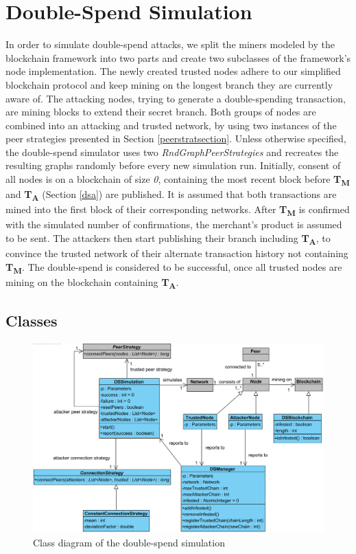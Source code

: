 \documentclass[a4paper,12pt,twoside]{report}
\begin{document}
\section{Double-Spend Simulation}
In order to simulate double-spend attacks, we split the miners modeled by the blockchain framework into two parts and create two subclasses of the framework's node implementation. The newly created trusted nodes adhere to our simplified blockchain protocol and keep mining on the longest branch they are currently aware of. The attacking nodes, trying to generate a double-spending transaction, are mining blocks to extend their secret branch. Both groups of nodes are combined into an attacking and trusted network, by using two instances of the peer strategies presented in Section \ref{peerstratsection}. Unless otherwise specified, the double-spend simulator uses two \textit{RndGraphPeerStrategies} and recreates the resulting graphs randomly before every new simulation run. Initially, consent of all nodes is on a blockchain of size \textit{0}, containing the most recent block before \textbf{T\textsubscript{M}} and \textbf{T\textsubscript{A}} (Section \ref{dsa}) are published. It is assumed that both transactions are mined into the first block of their corresponding networks. After \textbf{T\textsubscript{M}} is confirmed with the simulated number of confirmations, the merchant's product is assumed to be sent. The attackers then start publishing their branch including \textbf{T\textsubscript{A}}, to convince the trusted network of their alternate transaction history not containing \textbf{T\textsubscript{M}}. The double-spend is considered to be successful, once all trusted nodes are mining on the blockchain containing \textbf{T\textsubscript{A}}.
\subsection{Classes}
\begin{figure}[ht]
	\centering
  \includegraphics[width=\textwidth]{Simulation.png}
	\caption{Class diagram of the double-spend simulation}
	\label{simulation}
\end{figure}
\end{document}

